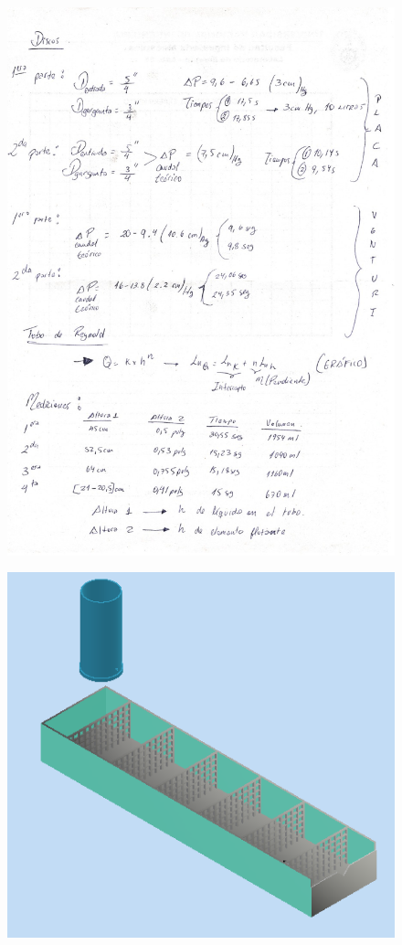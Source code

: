 \documentclass[a4paper,12pt]{report}
\begin{document}
\begin{figure}[H]
\centering
\includegraphics[scale=0.5]{datos2.jpeg}
\end{figure}
\begin{figure}[H]
\centering
\includegraphics[scale=0.9]{anexo1.png}
\end{figure}
\end{document}
